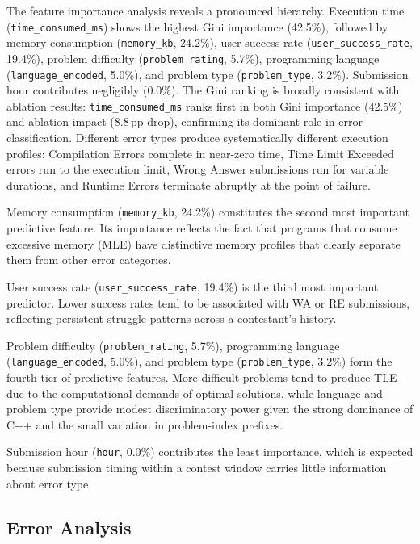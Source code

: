 \documentclass[acmsmall]{acmart}
\begin{document}
The feature importance analysis reveals a pronounced hierarchy.
Execution time (\texttt{time\_consumed\_ms}) shows the highest Gini
importance (42.5\%), followed by memory consumption (\texttt{memory\_kb},
24.2\%), user success rate (\texttt{user\_success\_rate}, 19.4\%), problem
difficulty (\texttt{problem\_rating}, 5.7\%), programming language
(\texttt{language\_encoded}, 5.0\%), and problem type (\texttt{problem\_type},
3.2\%). Submission hour contributes negligibly (0.0\%).
The Gini ranking is broadly consistent with ablation results:
\texttt{time\_consumed\_ms} ranks first in both Gini importance (42.5\%)
and ablation impact (8.8\,pp drop), confirming its dominant role in error
classification. Different error types produce systematically different
execution profiles: Compilation Errors complete in near-zero time, Time Limit
Exceeded errors run to the execution limit, Wrong Answer submissions run for
variable durations, and Runtime Errors terminate abruptly at the point of
failure.

Memory consumption (\texttt{memory\_kb}, 24.2\%) constitutes the second most
important predictive feature. Its importance reflects the fact that programs
that consume excessive memory (MLE) have distinctive memory profiles that
clearly separate them from other error categories.

User success rate (\texttt{user\_success\_rate}, 19.4\%) is the third most
important predictor. Lower success rates tend to be associated with WA or RE
submissions, reflecting persistent struggle patterns across a contestant's
history.

Problem difficulty (\texttt{problem\_rating}, 5.7\%), programming language
(\texttt{language\_encoded}, 5.0\%), and problem type (\texttt{problem\_type},
3.2\%) form the fourth tier of predictive features. More difficult problems
tend to produce TLE due to the computational demands of optimal
solutions, while language and problem type provide modest discriminatory power
given the strong dominance of C++ and the small variation in problem-index
prefixes.

Submission hour (\texttt{hour}, 0.0\%) contributes the least importance, which
is expected because submission timing within a contest window carries little
information about error type.

\subsection{Error Analysis}
\end{document}
